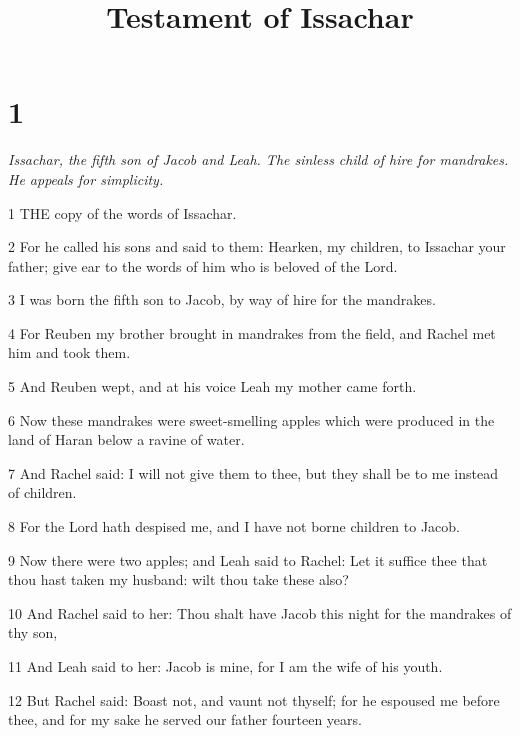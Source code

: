 

\title{Testament of Issachar}

\chapter{1}

\par \textit{Issachar, the fifth son of Jacob and Leah. The sinless child of hire for mandrakes. He appeals for simplicity.}

\par 1 THE copy of the words of Issachar.

\par 2 For he called his sons and said to them: Hearken, my children, to Issachar your father; give ear to the words of him who is beloved of the Lord.

\par 3 I was born the fifth son to Jacob, by way of hire for the mandrakes.

\par 4 For Reuben my brother brought in mandrakes from the field, and Rachel met him and took them.

\par 5 And Reuben wept, and at his voice Leah my mother came forth.

\par 6 Now these mandrakes were sweet-smelling apples which were produced in the land of Haran below a ravine of water.

\par 7 And Rachel said: I will not give them to thee, but they shall be to me instead of children.

\par 8 For the Lord hath despised me, and I have not borne children to Jacob.

\par 9 Now there were two apples; and Leah said to Rachel: Let it suffice thee that thou hast taken my husband: wilt thou take these also?

\par 10 And Rachel said to her: Thou shalt have Jacob this night for the mandrakes of thy son,

\par 11 And Leah said to her: Jacob is mine, for I am the wife of his youth.

\par 12 But Rachel said: Boast not, and vaunt not thyself; for he espoused me before thee, and for my sake he served our father fourteen years.

